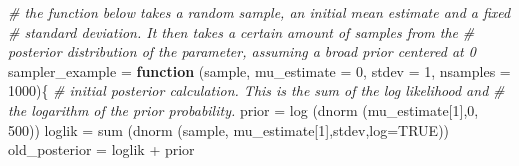 \documentclass[
]{book}
\newenvironment{Shaded}{\begin{snugshade}}{\end{snugshade}}
\newcommand{\AttributeTok}[1]{\textcolor[rgb]{0.77,0.63,0.00}{#1}}
\newcommand{\CommentTok}[1]{\textcolor[rgb]{0.56,0.35,0.01}{\textit{#1}}}
\newcommand{\ConstantTok}[1]{\textcolor[rgb]{0.00,0.00,0.00}{#1}}
\newcommand{\ControlFlowTok}[1]{\textcolor[rgb]{0.13,0.29,0.53}{\textbf{#1}}}
\newcommand{\DecValTok}[1]{\textcolor[rgb]{0.00,0.00,0.81}{#1}}
\newcommand{\FunctionTok}[1]{\textcolor[rgb]{0.00,0.00,0.00}{#1}}
\newcommand{\NormalTok}[1]{#1}
\newcommand{\OtherTok}[1]{\textcolor[rgb]{0.56,0.35,0.01}{#1}}
\newcommand{\SpecialCharTok}[1]{\textcolor[rgb]{0.00,0.00,0.00}{#1}}
\begin{document}
\begin{Shaded}
\begin{Highlighting}[]
\CommentTok{\# the function below takes a random sample, an initial mean estimate and a fixed}
\CommentTok{\# standard deviation. It then takes a certain amount of samples from the }
\CommentTok{\# posterior distribution of the parameter, assuming a broad prior centered at 0}
\NormalTok{sampler\_example }\OtherTok{=} \ControlFlowTok{function}\NormalTok{ (sample, }\AttributeTok{mu\_estimate =} \DecValTok{0}\NormalTok{, }\AttributeTok{stdev =} \DecValTok{1}\NormalTok{, }\AttributeTok{nsamples =} \DecValTok{1000}\NormalTok{)\{}
  \CommentTok{\# initial posterior calculation. This is the sum of the log likelihood and}
  \CommentTok{\# the logarithm of the prior probability.}
\NormalTok{  prior }\OtherTok{=} \FunctionTok{log}\NormalTok{ (}\FunctionTok{dnorm}\NormalTok{ (mu\_estimate[}\DecValTok{1}\NormalTok{],}\DecValTok{0}\NormalTok{, }\DecValTok{500}\NormalTok{))}
\NormalTok{  loglik }\OtherTok{=} \FunctionTok{sum}\NormalTok{ (}\FunctionTok{dnorm}\NormalTok{ (sample, mu\_estimate[}\DecValTok{1}\NormalTok{],stdev,}\AttributeTok{log=}\ConstantTok{TRUE}\NormalTok{))}
\NormalTok{  old\_posterior }\OtherTok{=}\NormalTok{ loglik }\SpecialCharTok{+}\NormalTok{ prior}
  

\end{Highlighting}
\end{Shaded}
\end{document}
